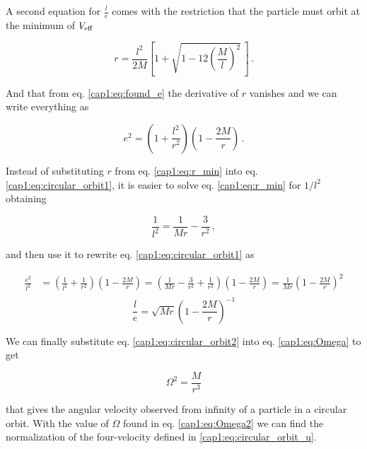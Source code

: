 A second equation for $\frac{l}{e}$ comes with the restriction that the
particle must orbit at the minimum of $V_{\rm eff}$

\begin{equation}
    r = \frac{l^2}{2 M} \left[1 +
    \sqrt{1 - 12 \left( \frac{M}{l} \right)^2} \, \right] \, .
    \label{cap1:eq:r_min}
\end{equation}

And that from eq. \ref{cap1:eq:found_e} the derivative of $r$ vanishes
and we can write everything as

\begin{equation}
    e^2 = \left(1 + \frac{l^2}{r^2} \right)
    \left(1 - \frac{2M}{r}\right) \, .
    \label{cap1:eq:circular_orbit1}
\end{equation}

Instead of substituting $r$ from eq. \ref{cap1:eq:r_min} into eq.
\ref{cap1:eq:circular_orbit1}, it is easier to solve eq. \ref{cap1:eq:r_min} for
$1 / l^2$ obtaining

\begin{equation}
    \frac{1}{l^2} = \frac{1}{M r} - \frac{3}{r^2} \, ,
\end{equation}

and then use it to rewrite eq. \ref{cap1:eq:circular_orbit1} as

\begin{align*}
    \frac{e^2}{l^2} &= \left(\frac{1}{l^2} + \frac{1}{r^2} \right)
    \left(1 - \frac{2M}{r}\right)
    = \left(\frac{1}{M r}
    - \frac{3}{r^2}
    + \frac{1}{r^2}\right)
    \left(1 - \frac{2M}{r}\right) 
    = \frac{1}{M r} \left(1
    - \frac{2 M}{r} \right)^2 \\
\end{align*}
\begin{equation}
    \frac{l}{e} = \sqrt{M r} \left(1
    - \frac{2 M}{r} \right)^{-1}
    \label{cap1:eq:circular_orbit2}
\end{equation}

We can finally substitute eq. \ref{cap1:eq:circular_orbit2} into eq.
\ref{cap1:eq:Omega} to get

\begin{equation}
    \Omega^2 = \frac{M}{r^3}
    \label{cap1:eq:Omega2}
\end{equation}

that gives the angular velocity observed from infinity of a particle in a
circular orbit.
With the value of $\Omega$ found in eq. \ref{cap1:eq:Omega2} we can find the
normalization of the four-velocity defined in \ref{cap1:eq:circular_orbit_u}.

